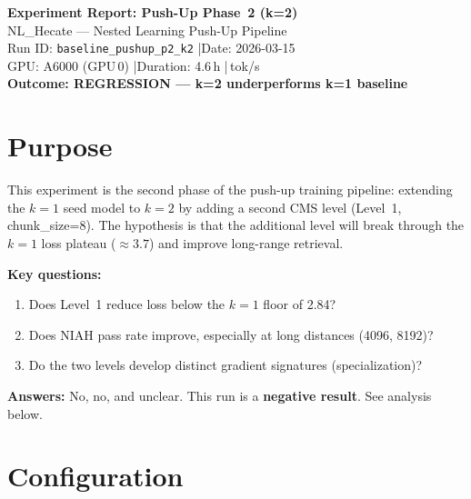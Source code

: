 \documentclass[11pt,a4paper]{article}
\begin{document}
\begin{center}
    {\LARGE\bfseries Experiment Report: Push-Up Phase~2 (k=2)}\\[0.6em]
    {\large\color{nlgray} NL\_Hecate --- Nested Learning Push-Up Pipeline}\\[0.4em]
    {\normalsize Run ID: \texttt{baseline\_pushup\_p2\_k2} \quad|\quad Date: 2026-03-15}\\[0.3em]
    {\normalsize GPU: A6000 (GPU\,0) \quad|\quad Duration: 4.6\,h \quad|\,tok/s}\\[0.5em]
    {\large\color{red}\bfseries Outcome: REGRESSION --- k=2 underperforms k=1 baseline}
\end{center}
\vspace{1em}

\section{Purpose}

This experiment is the second phase of the push-up training pipeline: extending the $k{=}1$
seed model to $k{=}2$ by adding a second CMS level (Level~1, chunk\_size=8). The hypothesis
is that the additional level will break through the $k{=}1$ loss plateau ($\approx 3.7$) and
improve long-range retrieval.

\textbf{Key questions:}
\begin{enumerate}[topsep=4pt, itemsep=2pt]
    \item Does Level~1 reduce loss below the $k{=}1$ floor of 2.84?
    \item Does NIAH pass rate improve, especially at long distances (4096, 8192)?
    \item Do the two levels develop distinct gradient signatures (specialization)?
\end{enumerate}

\textbf{Answers:} No, no, and unclear. This run is a \textbf{negative result}. See analysis below.


\section{Configuration}
\end{document}
